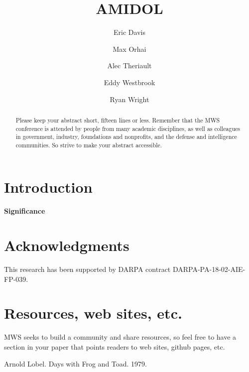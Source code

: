 \documentclass[11pt]{article}
\date{\vspace{-5ex}}
\author[1]{Eric Davis}
\author[1]{Max Orhai}
\author[1]{Alec Theriault}
\author[1]{Eddy Westbrook}
\author[1]{Ryan Wright}
\affil[1]{Galois, Inc}
\title{AMIDOL}
\begin{document}
\maketitle
\vspace{10pt}
\begin{abstract} 
Please keep your abstract short, fifteen lines or less.  Remember that the MWS conference is attended by people from many academic disciplines, as well as colleagues in government, industry, foundations and nonprofits, and the defense and intelligence communities.  So strive to make your abstract accessible. 
\end{abstract}

\section{Introduction}

\paragraph{Significance}

\section{Acknowledgments}

This research has been supported by DARPA contract DARPA-PA-18-02-AIE-FP-039.

\section{Resources, web sites, etc.}

MWS seeks to build a community and share resources, so feel free to have a section in your paper that points readers to web sites, github pages, etc. 

   
\begin{thebibliography}{9}

Arnold Lobel.  Days with Frog and Toad. 1979. 


\end{thebibliography}
\end{document}
